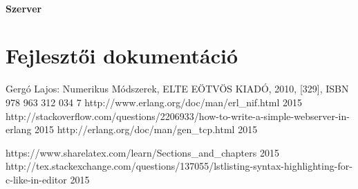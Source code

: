 \documentclass{elteikthesis}
\begin{document}
\subsubsection{Szerver}

\chapter{Fejlesztői dokumentáció}


\begin{thebibliography}{9}
Gergó Lajos: Numerikus Módszerek, ELTE EÖTVÖS KIADÓ, 2010, [329], ISBN 978 963 312 034 7
 {http://www.erlang.org/doc/man/erl\_nif.html} 2015
 {http://stackoverflow.com/questions/2206933/how-to-write-a-simple-webserver-in-erlang}
2015
 {http://erlang.org/doc/man/gen\_tcp.html}
2015


\bibitem{} {https://www.sharelatex.com/learn/Sections\_and\_chapters} 
2015
\bibitem{} {http://tex.stackexchange.com/questions/137055/lstlisting-syntax-highlighting-for-c-like-in-editor} 2015

\end{thebibliography}
\end{document}
